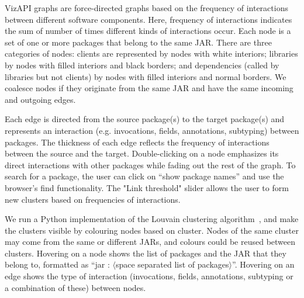 VizAPI graphs are force-directed graphs based on the frequency of
interactions between different software components. 
Here, frequency of interactions indicates the sum of number of times different kinds of interactions occur.
Each node is a
set of one or more packages that belong to the same JAR.  There are
three categories of nodes: clients are represented by nodes with white
interiors; libraries by nodes with filled interiors and black borders;
and dependencies (called by libraries but not clients) by nodes with
filled interiors and normal borders.  We coalesce nodes if they
originate from the same JAR and have the same incoming and
outgoing edges.

Each edge is directed
from the source package(s) to the target package(s) and represents an interaction 
(e.g. invocations, fields, annotations, subtyping) between packages. 
The thickness of each edge reflects the frequency of interactions between the source and the target.
Double-clicking on a node emphasizes its direct interactions with other packages while fading out the rest of the graph.
To search for a package, the user can click on “show package
names” and use the browser’s find functionality. 
The "Link threshold" slider allows the user to form new clusters based on frequencies of interactions.


We run a Python implementation of the Louvain clustering algorithm~\cite{blondel2008fast}, and make the clusters 
visible by colouring nodes based on cluster.
Nodes of the same cluster may come from the same or different JARs, and colours could be reused between clusters.
Hovering on a node shows the list of packages and 
the JAR that they belong to, 
formatted as “jar : $\langle$space separated list of packages$\rangle$”. 
Hovering on an edge shows the type of interaction (invocations, fields, annotations, subtyping or a combination of these) between nodes.

